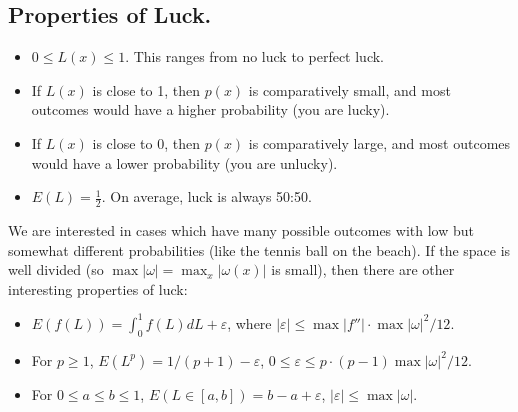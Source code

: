 \subsection{Properties of Luck.}
\begin{itemize}
\item $0 \leq L(x) \leq 1$.  This ranges from no luck to perfect luck.
\item If $L(x)$ is close to 1, then $p(x)$ is comparatively small, and most outcomes would have a higher probability (you are lucky).  
\item If $L(x)$ is close to 0, then $p(x)$ is comparatively large, and most outcomes would have a lower probability (you are unlucky).
\item $E(L)=\frac{1}{2}$.  On average, luck is always 50:50.
\end{itemize}

We are interested in cases which have many possible outcomes with low but somewhat different probabilities (like the tennis ball on the beach).  If the space is well divided (so $\max |\omega|=\max_{x}|\omega(x)|$ is small), then there are other interesting properties of luck:
\begin{itemize}
\item $E(f(L))=\int_0^1 f(L) dL+\varepsilon$, where $|\varepsilon| \leq \max|f''| \cdot \max |\omega|^2 / 12$.
\item For $p \geq 1$, $E(L^p)=1/(p+1)-\varepsilon$, $0 \leq \varepsilon \leq p \cdot (p-1) \max |\omega|^2/12$.
\item For $0 \leq a \leq b \leq 1$, $E(L \in [a,b])=b-a + \varepsilon$, $|\varepsilon| \leq \max |\omega|$.
\end{itemize}

